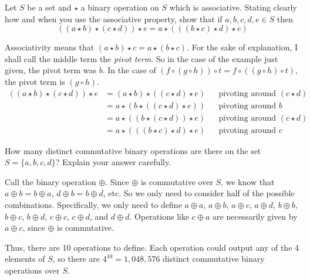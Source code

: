 \documentclass[a4paper]{article}
\begin{document}

\begin{questionbody}
Let $S$ be a set and $\star$ a binary operation on $S$ which is associative. Stating clearly how and when you use the associative property, show that if $a, b, c, d, e \in S$ then \[
((a \star b) \star (c \star d)) \star e = a \star (((b \star c) \star d) \star e)
\]
\end{questionbody}

Associativity means that $(a \star b) \star c = a \star (b \star c)$. For the sake of explanation, I shall call the middle term the \textit{pivot term}. So in the case of the example just given, the pivot term was $b$. In the case of $(f \circ (g \circ h)) \circ t = f \circ ((g \circ h) \circ t)$, the pivot term is $(g \circ h)$.
\begin{align*}
    ((a \star b) \star (c \star d)) \star e &= (a \star b) \star ((c \star d) \star e) &&\text{pivoting around } (c \star d) \\[1ex]
                                            &= a \star (b \star ((c \star d) \star e)) &&\text{pivoting around } b \\[1ex]
                                            &= a \star ((b \star (c \star d)) \star e) &&\text{pivoting around } (c \star d) \\[1ex]
                                            &= a \star (((b \star c) \star d) \star e) &&\text{pivoting around } c
\end{align*}


\begin{questionbody}
How many distinct commutative binary operations are there on the set $S = \{a, b, c, d\}$? Explain your answer carefully.
\end{questionbody}

Call the binary operation $\oplus$. Since $\oplus$ is commutative over $S$, we know that $a \oplus b = b \oplus a$, $d \oplus b = b \oplus d$, etc. So we only need to consider half of the possible combinations. Specifically, we only need to define $a \oplus a$, $a \oplus b$, $a \oplus c$, $a \oplus d$, $b \oplus b$, $b \oplus c$, $b \oplus d$, $c \oplus c$, $c \oplus d$, and $d \oplus d$. Operations like $c \oplus a$ are necessarily given by $a \oplus c$, since $\oplus$ is commutative.

Thus, there are 10 operations to define. Each operation could output any of the 4 elements of $S$, so there are $4^{10} = 1,048,576$ distinct commutative binary operations over $S$.
\end{document}
